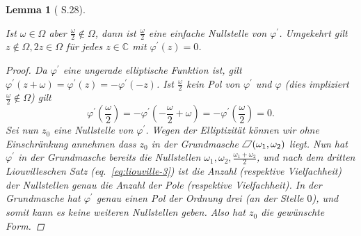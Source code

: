 \documentclass[12pt]{article}
\newtheorem{lemma}[theorem]{Lemma}
\numberwithin{equation}{section}
\newcommand{\ohalbe}{\frac{\omega}{2}}
\newcommand{\kk}{\cite{kk} }
\newcommand*{\pa}{%
    \rlap{\rotatebox{-30}{\rule[.05ex]{.4pt}{.77em}}}%
    \kern.04em%
    \rlap{\kern.36em\raisebox{0.649519052835em}{\rule{.6em}{.4pt}}}%
    \rule{.6em}{.4pt}\kern-.04em%
    \rotatebox{-30}{\rule[.05ex]{.4pt}{.77em}}}
\begin{document}
\begin{lemma}[\kk S.28]\label{lem-a}

Ist \(\omega \in \Omega\) aber \(\ohalbe \notin \Omega\), dann ist
\(\ohalbe\) eine einfache Nullstelle von \(\varphi ^\prime\). Umgekehrt
gilt \(z \notin \Omega, 2z \in \Omega\) für jedes \(z \in \mathbb C\)
mit \(\varphi ^\prime(z)=0\).

\begin{proof}

Da \(\varphi ^\prime\) eine ungerade elliptische Funktion ist, gilt
\(\varphi ^\prime(z + \omega )=\varphi ^\prime(z) = - \varphi ^\prime(-z)\).
Ist \(\ohalbe\) kein Pol von \(\varphi ^\prime\) und \(\varphi\) (dies
impliziert \(\ohalbe \notin \Omega\)) gilt \begin{equation}{
\varphi ^\prime (\ohalbe) = - \varphi ^\prime(- \ohalbe + \omega) = - \varphi ^\prime(\ohalbe) = 0.
}\end{equation} Sei nun \(z_0\) eine Nullstelle von \(\varphi ^\prime\).
Wegen der Elliptizität können wir ohne Einschränkung annehmen dass
\(z_0\) in der Grundmasche \(\pa(\omega _1, \omega _2)\) liegt. Nun hat
\(\varphi ^\prime\) in der Grundmasche bereits die Nullstellen
\(\omega_1, \omega_2, \frac{\omega _1 + \omega _2}{2}\), und nach dem
dritten Liouvilleschen Satz (eq.~\ref{eq:liouville-3}) ist die Anzahl
(respektive Vielfachheit) der Nullstellen genau die Anzahl der Pole
(respektive Vielfachheit). In der Grundmasche hat \(\varphi ^\prime\)
genau einen Pol der Ordnung drei (an der Stelle \(0\)), und somit kann
es keine weiteren Nullstellen geben. Also hat \(z_0\) die gewünschte
Form.

\end{proof}

\end{lemma}
\end{document}
